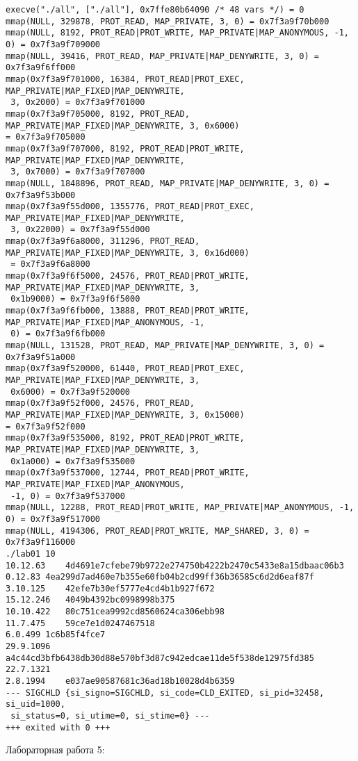 \documentclass[12pt]{article}
\begin{document}
{{\begin{lstlisting}[escapechar=!]
execve("./all", ["./all"], 0x7ffe80b64090 /* 48 vars */) = 0
mmap(NULL, 329878, PROT_READ, MAP_PRIVATE, 3, 0) = 0x7f3a9f70b000
mmap(NULL, 8192, PROT_READ|PROT_WRITE, MAP_PRIVATE|MAP_ANONYMOUS, -1, 0) = 0x7f3a9f709000
mmap(NULL, 39416, PROT_READ, MAP_PRIVATE|MAP_DENYWRITE, 3, 0) = 0x7f3a9f6ff000
mmap(0x7f3a9f701000, 16384, PROT_READ|PROT_EXEC, MAP_PRIVATE|MAP_FIXED|MAP_DENYWRITE,
 3, 0x2000) = 0x7f3a9f701000
mmap(0x7f3a9f705000, 8192, PROT_READ, MAP_PRIVATE|MAP_FIXED|MAP_DENYWRITE, 3, 0x6000) 
= 0x7f3a9f705000
mmap(0x7f3a9f707000, 8192, PROT_READ|PROT_WRITE, MAP_PRIVATE|MAP_FIXED|MAP_DENYWRITE,
 3, 0x7000) = 0x7f3a9f707000
mmap(NULL, 1848896, PROT_READ, MAP_PRIVATE|MAP_DENYWRITE, 3, 0) = 0x7f3a9f53b000
mmap(0x7f3a9f55d000, 1355776, PROT_READ|PROT_EXEC, MAP_PRIVATE|MAP_FIXED|MAP_DENYWRITE,
 3, 0x22000) = 0x7f3a9f55d000
mmap(0x7f3a9f6a8000, 311296, PROT_READ, MAP_PRIVATE|MAP_FIXED|MAP_DENYWRITE, 3, 0x16d000)
 = 0x7f3a9f6a8000
mmap(0x7f3a9f6f5000, 24576, PROT_READ|PROT_WRITE, MAP_PRIVATE|MAP_FIXED|MAP_DENYWRITE, 3,
 0x1b9000) = 0x7f3a9f6f5000
mmap(0x7f3a9f6fb000, 13888, PROT_READ|PROT_WRITE, MAP_PRIVATE|MAP_FIXED|MAP_ANONYMOUS, -1,
 0) = 0x7f3a9f6fb000
mmap(NULL, 131528, PROT_READ, MAP_PRIVATE|MAP_DENYWRITE, 3, 0) = 0x7f3a9f51a000
mmap(0x7f3a9f520000, 61440, PROT_READ|PROT_EXEC, MAP_PRIVATE|MAP_FIXED|MAP_DENYWRITE, 3,
 0x6000) = 0x7f3a9f520000
mmap(0x7f3a9f52f000, 24576, PROT_READ, MAP_PRIVATE|MAP_FIXED|MAP_DENYWRITE, 3, 0x15000) 
= 0x7f3a9f52f000
mmap(0x7f3a9f535000, 8192, PROT_READ|PROT_WRITE, MAP_PRIVATE|MAP_FIXED|MAP_DENYWRITE, 3,
 0x1a000) = 0x7f3a9f535000
mmap(0x7f3a9f537000, 12744, PROT_READ|PROT_WRITE, MAP_PRIVATE|MAP_FIXED|MAP_ANONYMOUS,
 -1, 0) = 0x7f3a9f537000
mmap(NULL, 12288, PROT_READ|PROT_WRITE, MAP_PRIVATE|MAP_ANONYMOUS, -1, 0) = 0x7f3a9f517000
mmap(NULL, 4194306, PROT_READ|PROT_WRITE, MAP_SHARED, 3, 0) = 0x7f3a9f116000
./lab01 10
10.12.63	4d4691e7cfebe79b9722e274750b4222b2470c5433e8a15dbaac06b3
0.12.83	4ea299d7ad460e7b355e60fb04b2cd99ff36b36585c6d2d6eaf87f
3.10.125	42efe7b30ef5777e4cd4b1b927f672
15.12.246	4049b4392bc0998998b375
10.10.422	80c751cea9992cd8560624ca306ebb98
11.7.475	59ce7e1d0247467518
6.0.499	1c6b85f4fce7
29.9.1096	a4c44cd3bfb6438db30d88e570bf3d87c942edcae11de5f538de12975fd385
22.7.1321	
2.8.1994	e037ae90587681c36ad18b10028d4b6359
--- SIGCHLD {si_signo=SIGCHLD, si_code=CLD_EXITED, si_pid=32458, si_uid=1000,
 si_status=0, si_utime=0, si_stime=0} ---
+++ exited with 0 +++

\end{lstlisting}
}
Лабораторная работа 5:
{
\scriptsize

}}
\end{document}
